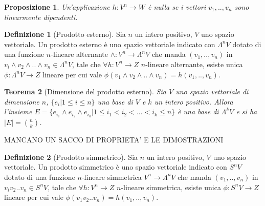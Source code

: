 \documentclass[11pt]{article}
\theoremstyle{plain}
\newtheorem{thm}{Teorema}[section]
\newtheorem{prop}[thm]{Proposizione}
\theoremstyle{definition}
\newtheorem{defn}{Definizione}[section]
\theoremstyle{remark}
\begin{document}
 \begin{prop}
  Un'applicazione $h: V^n \to W$ è nulla se i vettori $v_1,..,v_n$ sono linearmente dipendenti.
 \end{prop}

\begin{defn}[Prodotto esterno]
Sia $n$ un intero positivo, $V$ uno spazio vettoriale. Un prodotto esterno è uno spazio vettoriale indicato con $\Lambda^n V$
dotato di una funzione $n$-lineare alternante $\wedge: V^n \to \Lambda^n V$ che manda $(v_1,..,v_n)$ in 
$v_i\wedge v_2\wedge..\wedge v_n \in \Lambda^n V$, tale che $\forall h: V^n \to Z$ $n$-lineare alternante, 
esiste unica $\phi: \Lambda^n V \to Z $ lineare per cui vale $\phi(v_1\wedge v_2\wedge .. \wedge v_n)=h(v_1,..,v_n)$.

\label{defn:prodotto esterno}
\end{defn}





\begin{thm}[Dimensione del prodotto esterno]
Sia $V$ uno spazio vettoriale di dimensione $n$, $\{e_i| 1 \leq i \leq n\}$ una base di $V$ e $k$ un intero positivo.
Allora l'insieme $E=\{e_{i_1} \wedge e_{i_2} \wedge e_{i_k}| 1 \leq i_1 < i_2 <...< i_k \leq n\}$ è una base di $\Lambda^k V$ 
e si ha $|E|= \binom {n}{k}$.

\label{thm:prodotto esterno}
\end{thm}


MANCANO UN SACCO DI PROPRIETA' E LE DIMOSTRAZIONI





\begin{defn}[Prodotto simmetrico]

Sia $n$ un intero positivo, $V$ uno spazio vettoriale. Un prodotto simmetrico è uno spazio vettoriale indicato con $S^n V$
dotato di una funzione $n$-lineare simmetrica $V^n \to \Lambda^n V$ che manda $(v_1,..,v_n)$ in 
$v_i v_2..v_n \in S^n V$, tale che $\forall h: V^n \to Z$ $n$-lineare simmetrica, 
esiste unica $\phi: S^n V \to Z $ lineare per cui vale $\phi(v_1 v_2 .. v_n)=h(v_1,..,v_n)$.

\label{defn:prodotto simmetrico}
\end{defn}
\end{document}
